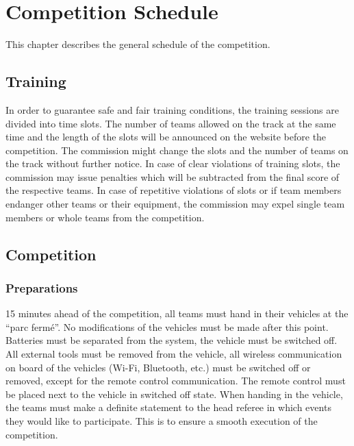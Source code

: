 \chapter{Competition Schedule}

This chapter describes the general schedule of the competition.

\section{Training}

In order to guarantee safe and fair training conditions, the training sessions
are divided into time slots. The number of teams allowed on the track at the
same time and the length of the slots will be announced on the website before
the competition. The commission might change the slots and the number of teams
on the track without further notice. In case of clear violations of training
slots, the commission may issue penalties which will be subtracted from the
final score of the respective teams. In case of repetitive violations of slots
or if team members endanger other teams or their equipment, the commission may
expel single team members or whole teams from the competition.



\section{Competition}
\subsection{Preparations}

15 minutes ahead of the competition, all teams must hand in their vehicles at the “parc fermé”. No modifications of the vehicles must be made after this point. Batteries must be separated from the system, the vehicle must be switched off. All external tools must be removed from the vehicle, all wireless communication on board of the vehicles (Wi-Fi, Bluetooth, etc.) must be switched off or removed, except for the remote control communication. The remote control must be placed next to the vehicle in switched off state. When handing in the vehicle, the teams must make a definite statement to the head referee in which events they would like to participate. This is to ensure a smooth execution of the competition.

